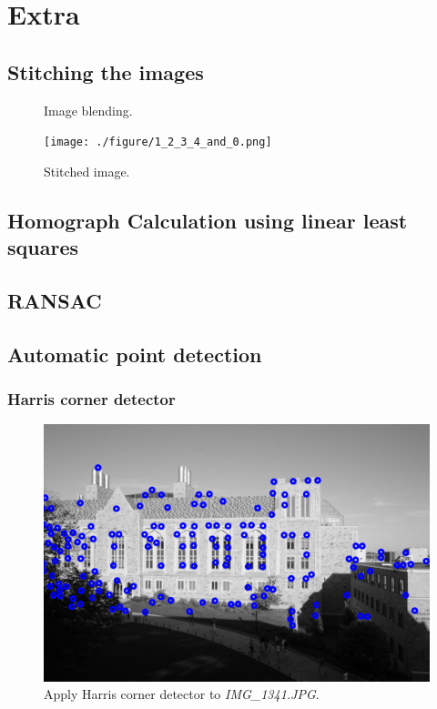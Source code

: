 \documentclass[paper=a4, fontsize=11pt]{scrartcl}
\begin{document}
\section{Extra}

\subsection{Stitching the images}

\begin{figure}[h]
\centering
{} 
\caption{Image blending.}
\label{fig:blending}
\end{figure}

\begin{figure}[h]
\centering
\texttt{[image: ./figure/1\_2\_3\_4\_and\_0.png]} 
\caption{Stitched image.}
\label{fig:stitched_image}
\end{figure}

\subsection{Homograph Calculation using linear least squares}

\subsection{RANSAC}

\subsection{Automatic point detection}

\subsubsection{Harris corner detector}

\begin{figure}[h]
\centering
\includegraphics[width=.8\textwidth]{./figure/IMG_1341_hcd.jpg} 
\caption{Apply Harris corner detector to \emph{IMG\_1341.JPG}.}
\label{fig:corner_detection}
\end{figure}
\end{document}
